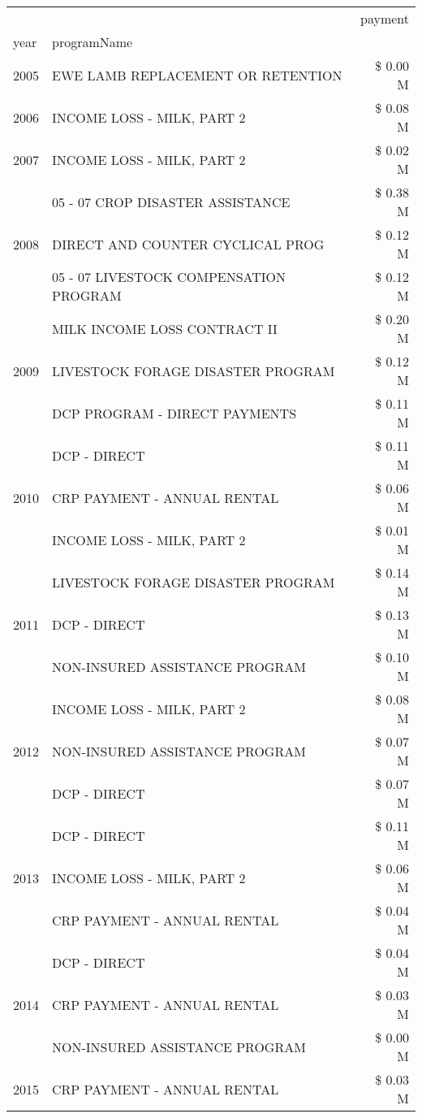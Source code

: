 \begin{tabular}{llr}
\toprule
 &  & payment \\
year & programName &  \\
\midrule
2005 & EWE LAMB REPLACEMENT OR RETENTION & \$ 0.00 M \\
\cline{1-3}
2006 & INCOME LOSS - MILK, PART 2 & \$ 0.08 M \\
\cline{1-3}
2007 & INCOME LOSS - MILK, PART 2 & \$ 0.02 M \\
\cline{1-3}
\multirow[t]{3}{*}{2008} & 05 - 07 CROP DISASTER ASSISTANCE & \$ 0.38 M \\
 & DIRECT AND COUNTER CYCLICAL PROG & \$ 0.12 M \\
 & 05 - 07 LIVESTOCK COMPENSATION PROGRAM & \$ 0.12 M \\
\cline{1-3}
\multirow[t]{3}{*}{2009} & MILK INCOME LOSS CONTRACT II & \$ 0.20 M \\
 & LIVESTOCK FORAGE DISASTER  PROGRAM & \$ 0.12 M \\
 & DCP PROGRAM - DIRECT PAYMENTS & \$ 0.11 M \\
\cline{1-3}
\multirow[t]{3}{*}{2010} & DCP - DIRECT & \$ 0.11 M \\
 & CRP PAYMENT - ANNUAL RENTAL & \$ 0.06 M \\
 & INCOME LOSS - MILK, PART 2 & \$ 0.01 M \\
\cline{1-3}
\multirow[t]{3}{*}{2011} & LIVESTOCK FORAGE DISASTER PROGRAM & \$ 0.14 M \\
 & DCP - DIRECT & \$ 0.13 M \\
 & NON-INSURED ASSISTANCE PROGRAM & \$ 0.10 M \\
\cline{1-3}
\multirow[t]{3}{*}{2012} & INCOME LOSS - MILK, PART 2 & \$ 0.08 M \\
 & NON-INSURED ASSISTANCE PROGRAM & \$ 0.07 M \\
 & DCP - DIRECT & \$ 0.07 M \\
\cline{1-3}
\multirow[t]{3}{*}{2013} & DCP - DIRECT & \$ 0.11 M \\
 & INCOME LOSS - MILK, PART 2 & \$ 0.06 M \\
 & CRP PAYMENT - ANNUAL RENTAL & \$ 0.04 M \\
\cline{1-3}
\multirow[t]{3}{*}{2014} & DCP - DIRECT & \$ 0.04 M \\
 & CRP PAYMENT - ANNUAL RENTAL & \$ 0.03 M \\
 & NON-INSURED ASSISTANCE PROGRAM & \$ 0.00 M \\
\cline{1-3}
\multirow[t]{3}{*}{2015} & CRP PAYMENT - ANNUAL RENTAL & \$ 0.03 M \\

\end{tabular}
